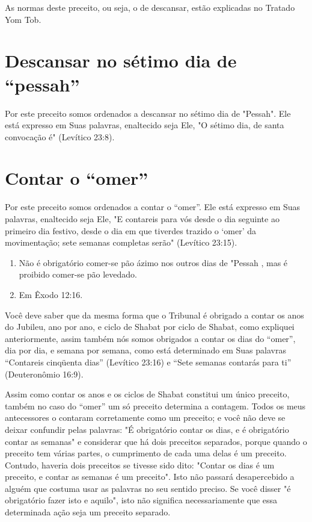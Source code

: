 As normas deste preceito, ou seja, o de descansar, estão explicadas no
Tratado Yom Tob.

\section{Descansar no sétimo dia de ``pessah''}

Por este preceito somos ordenados a descansar no sétimo dia de
"Pes­sah". Ele está expresso em Suas palavras, enaltecido seja Ele, "O
sétimo dia, de santa convocação é" (Levítico 23:8).

\section{Contar o ``omer''}

Por este preceito somos ordenados a contar o ``omer''. Ele está ex­presso
em Suas palavras, enaltecido seja Ele, "E contareis para vós desde o dia
seguinte ao primeiro dia festivo, desde o dia em que tiverdes trazido o
`omer' da movimentação; sete semanas completas serão" (Levítico 23:15).


\begin{enumerate}
\def\labelenumi{\arabic{enumi}.}
\setcounter{enumi}{182}
\item
 
 Não é obrigatório comer-se pão ázimo nos outros dias de "Pessah , mas
 é proibido comer-se pão levedado.
 
\item
 
 Em Êxodo 12:16.
 
\end{enumerate}




Você deve saber que da mesma forma que o Tribunal é obrigado a contar os
anos do Jubileu, ano por ano, e ciclo de Shabat por ciclo de Shabat,
como expliquei anteriormente, assim também nós somos obrigados a contar
os dias do ``omer'', dia por dia, e semana por semana, como está
determinado em Suas palavras ``Contareis cinqüenta dias'' (Levítico 23:16)
e ``Sete semanas contarás para ti'' (Deuteronômio 16:9).

Assim como contar os anos e os ciclos de Shabat constitui um único
preceito, também no caso do ``omer'' um só preceito determina a contagem.
Todos os meus antecessores o contaram corretamente como um preceito; e
você não deve se deixar confundir pelas palavras: "É obrigatório contar
os dias, e é obrigatório contar as semanas" e considerar que há dois
preceitos separados, porque quando o preceito tem várias partes, o
cumprimento de cada uma delas é um preceito. Contudo, haveria dois
preceitos se tivesse sido dito: "Contar os dias é um preceito, e contar
as semanas é um preceito". Isto não passará desapercebido a alguém que
costuma usar as palavras no seu sentido preciso. Se você disser "é
obrigatório fazer isto e aquilo", isto não significa necessaria­mente
que essa determinada ação seja um preceito separado.

